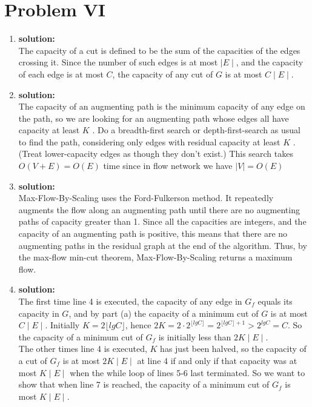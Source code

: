 \section{Problem VI}
\begin{enumerate}[label=(\alph*)]
	\item \textbf{solution:}\\
	The capacity of a cut is defined to be the sum of the capacities of the edges crossing it. Since the number of such edges is at most $\mid E \mid$, and the capacity of each edge is at most $C$, the capacity of any cut of $G$ is at most $C\mid E \mid$.

	\item \textbf{solution:}\\
	The capacity of an augmenting path is the minimum capacity of any edge on the path, so we are looking for an augmenting path whose edges all have capacity at least $K$ . Do a breadth-first search or depth-first-search as usual to find the path, considering only edges with residual capacity at least $K$ . (Treat lower-capacity edges as though they don't exist.) This search takes $O(V + E) = O(E)$ time since in flow network we have $\mid V \mid = O(E)$

	\item \textbf{solution:}\\
	Max-Flow-By-Scaling uses the Ford-Fulkerson method. It repeatedly augments the flow along an augmenting path until there are no augmenting paths of capacity greater than 1. Since all the capacities are integers, and the capacity of an augmenting path is positive, this means that there are no augmenting paths in the residual graph at the end of the algorithm. Thus, by the max-flow min-cut theorem, Max-Flow-By-Scaling returns a maximum flow.

	\item \textbf{solution:}\\
	The first time line 4 is executed, the capacity of any edge in $G_f$ equals its capacity in $G$, and by part (a) the capacity of a minimum cut of $G$ is at most $C\mid E \mid$. Initially $K = 2\lfloor lgC \rfloor$, hence $2K = 2 \cdot 2^{\lfloor lgC \rfloor} = 2^{\lfloor lgC \rfloor + 1} > 2^{lgC} = C$. So the capacity of a minimum cut of $G_f$ is initially less than $2K \mid E \mid$.\\

	The other times line 4 is executed, $K$ has just been halved, so the capacity of a cut of $G_f$ is at most $2K \mid E \mid$ at line 4 if and only if that capacity was at most $K \mid E \mid$ when the while loop of lines 5-6 last terminated. So we want to show that when line 7 is reached, the capacity of a minimum cut of $G_f$ is most $K \mid E \mid$.\\


\end{enumerate}

